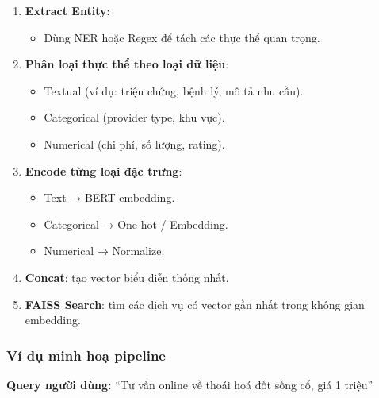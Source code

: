 \begin{enumerate}
    \item \textbf{Extract Entity}:
    \begin{itemize}
        \item Dùng NER hoặc Regex để tách các thực thể quan trọng.
    \end{itemize}

    \item \textbf{Phân loại thực thể theo loại dữ liệu}:
    \begin{itemize}
        \item Textual (ví dụ: triệu chứng, bệnh lý, mô tả nhu cầu).
        \item Categorical (provider type, khu vực).
        \item Numerical (chi phí, số lượng, rating).
    \end{itemize}

    \item \textbf{Encode từng loại đặc trưng}:
    \begin{itemize}
        \item Text → BERT embedding.
        \item Categorical → One-hot / Embedding.
        \item Numerical → Normalize.
    \end{itemize}

    \item \textbf{Concat}: tạo vector biểu diễn thống nhất.

    \item \textbf{FAISS Search}: tìm các dịch vụ có vector gần nhất trong không gian embedding.
\end{enumerate}

\subsubsection{Ví dụ minh hoạ pipeline}

\textbf{Query người dùng:} ``Tư vấn online về thoái hoá đốt sống cổ, giá 1 triệu''

